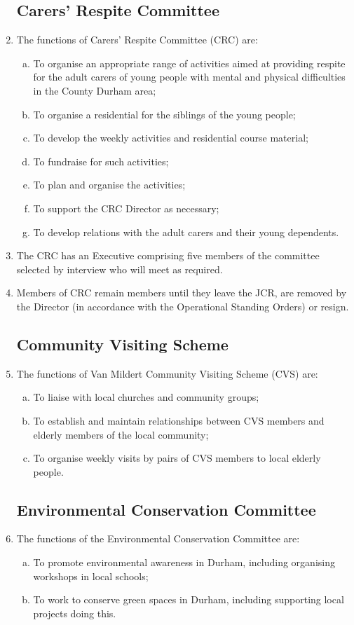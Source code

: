 \documentclass[12pt]{article}  %
\begin{document}
\begin{enumerate}
	\subsection{Carers’ Respite Committee}
	\item The functions of Carers’ Respite Committee (CRC) are:
	\begin{enumerate}[(a)]
		\item To organise an appropriate range of activities aimed at providing respite for the adult carers of young people with mental and physical difficulties in the County Durham area;
		\item To organise a residential for the siblings of the young people;
		\item To develop the weekly activities and residential course material;
		\item To fundraise for such activities;
		\item To plan and organise the activities;
		\item To support the CRC Director as necessary;
		\item To develop relations with the adult carers and their young dependents.
	\end{enumerate}
	\item The CRC has an Executive comprising five members of the committee selected by interview who will meet as required.
	\item Members of CRC remain members until they leave the JCR, are removed by the Director (in accordance with the Operational Standing Orders) or resign. 
	\subsection{Community Visiting Scheme}
	\item The functions of Van Mildert Community Visiting Scheme (CVS) are:
	\begin{enumerate}[(a)]
		\item To liaise with local churches and community groups;
		\item To establish and maintain relationships between CVS members and elderly members of the local community;
		\item To organise weekly visits by pairs of CVS members to local elderly people.
	\end{enumerate}
	\subsection{Environmental Conservation Committee}
	\item The functions of the Environmental Conservation Committee are:
	\begin{enumerate}[(a)]
		\item To promote environmental awareness in Durham, including organising workshops in local schools;
		\item To work to conserve green spaces in Durham, including supporting local projects doing this.
	\end{enumerate}

\end{enumerate}
\end{document}
